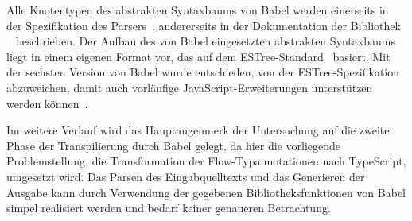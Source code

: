 Alle Knotentypen des abstrakten Syntaxbaums von Babel werden einerseits in der Spezifikation des Parsers~\autocite{BABEL:PARSER_SPEC,BABEL:PARSER}, andererseits in der Dokumentation der Bibliothek ~\autocite{BABEL:TYPES} beschrieben.
Der Aufbau des von Babel eingesetzten abstrakten Syntaxbaums liegt in einem eigenen Format vor, das auf dem ESTree-Standard~\autocite{ESTREE_SPEC} basiert. Mit der sechsten Version von Babel wurde entschieden, von der ESTree-Spezifikation abzuweichen, damit auch vorläufige JavaScript-Erweiterungen unterstützen werden können~\autocite{BABEL:STATE_OF_BABEL}.

Im weitere Verlauf wird das Hauptaugenmerk der Untersuchung auf die zweite Phase der Transpilierung durch Babel gelegt, da hier die vorliegende Problemstellung, die Transformation der Flow-Typannotationen nach TypeScript, umgesetzt wird. Das Parsen des Eingabquelltexts und das Generieren der Ausgabe kann durch Verwendung der gegebenen Bibliotheksfunktionen von Babel simpel realisiert werden und bedarf keiner genaueren Betrachtung.

